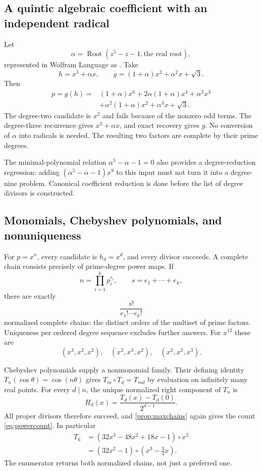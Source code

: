 \documentclass[11pt,a4paper]{article}
\theoremstyle{definition}
\newcommand{\code}[1]{\texttt{\detokenize{#1}}}
\begin{document}
\subsection{A quintic algebraic coefficient with an independent radical}
Let
\[
 \alpha=\operatorname{Root}(z^5-z-1,\text{the real root}),
\]
represented in Wolfram Language as \code{Root[#^5-#-1 &,1]}. Take
\[
 h=x^3+\alpha x,\qquad
 g=(1+\alpha)x^2+\alpha^2x+\sqrt3.
\]
Then
\begin{align*}
 p=g(h)={}&(1+\alpha)x^6+2\alpha(1+\alpha)x^4+\alpha^2x^3\\
 &+\alpha^2(1+\alpha)x^2+\alpha^3x+\sqrt3.
\end{align*}
The degree-two candidate is $x^2$ and fails because of the nonzero odd terms. The degree-three recurrence gives $x^3+\alpha x$, and exact recovery gives $g$. No conversion of $\alpha$ into radicals is needed. The resulting two factors are complete by their prime degrees.

The minimal-polynomial relation $\alpha^5-\alpha-1=0$ also provides a degree-reduction regression: adding $(\alpha^5-\alpha-1)x^9$ to this input must not turn it into a degree-nine problem. Canonical coefficient reduction is done before the list of degree divisors is constructed.

\subsection{Monomials, Chebyshev polynomials, and nonuniqueness}
For $p=x^n$, every candidate is $h_d=x^d$, and every divisor succeeds. A complete chain consists precisely of prime-degree power maps. If
\[
 n=\prod_{i=1}^k p_i^{e_i},\qquad s=e_1+\cdots+e_k,
\]
there are exactly
\begin{equation}
 \frac{s!}{e_1!\cdots e_k!}\label{eq:powercount}
\end{equation}
normalized complete chains: the distinct orders of the multiset of prime factors. Uniqueness per ordered degree sequence excludes further answers. For $x^{12}$ these are
\[
 (x^3,x^2,x^2),\quad(x^2,x^3,x^2),\quad(x^2,x^2,x^3).
\]

Chebyshev polynomials supply a nonmonomial family. Their defining identity $T_n(\cos\theta)=\cos(n\theta)$ gives $T_m\circ T_d=T_{md}$ by evaluation on infinitely many real points. For every $d\mid n$, the unique normalized right component of $T_n$ is
\[
 H_d(x)=\frac{T_d(x)-T_d(0)}{2^{d-1}}.
\]
All proper divisors therefore succeed, and \cref{prop:maxchains} again gives the count \eqref{eq:powercount}. In particular
\begin{align*}
 T_6&=(32x^3-48x^2+18x-1)\circ x^2\\
    &=(32x^2-1)\circ\left(x^3-\frac34x\right).
\end{align*}
The enumerator returns both normalized chains, not just a preferred one.
\end{document}
